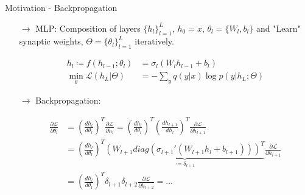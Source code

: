 \documentclass[dvipsnames, usenames]{beamer}
\begin{document}
\begin{frame}{Motivation - Backpropagation}

\begin{itemize}
	\item[$\rightarrow$] MLP: Composition of layers $\{h_l\}_{l=1}^L$, $h_0 = x$, $\theta_l =\{W_l, b_l\}$ and "Learn" synaptic weights, $\Theta = \{\theta_l\}_{l=1}^L$ iteratively. 
	\vspace{-0.5cm}

\begin{align*}
h_l \coloneqq f(h_{l-1}; \theta_l) &= \sigma_l (W_l h_{l-1} + b_l)\\
\min_\theta \mathcal{L}(h_L|\Theta) &= - \sum_y q(y|x) \log p(y|h_L; \Theta)
\end{align*}
	\pause
	\item[$\rightarrow$] Backpropagation:
	\vspace{-0.5cm}

\begin{align*}
	\frac{\partial \mathcal{L}}{\partial \theta_l} &= \left(\frac{dh_{l}}{d \theta_{l}}\right)^T \frac{\partial \mathcal{L}}{\partial h_{l}} = \left(\frac{dh_{l}}{d \theta_{l}}\right)^T \left(\frac{dh_{l+1}}{d h_{l}}\right)^T \frac{\partial \mathcal{L}}{\partial h_{l+1}} \\ 
	&=  \left(\frac{dh_{l}}{d \theta_{l}}\right)^T \underbrace{\left(W_{l+1} diag\left(\sigma_{l+1}'(W_{l+1}h_l +b_{l+1})\right)\right)^T}_{\coloneqq \delta_{l+1}} \frac{\partial \mathcal{L}}{\partial h_{l+1}} \\
	&= \left(\frac{dh_{l}}{d \theta_{l}}\right)^T \delta_{l+1} \delta_{l+2}\frac{\partial \mathcal{L}}{\partial h_{l+2}} = \dots 
\end{align*}
\end{itemize}
\end{frame}
\end{document}
